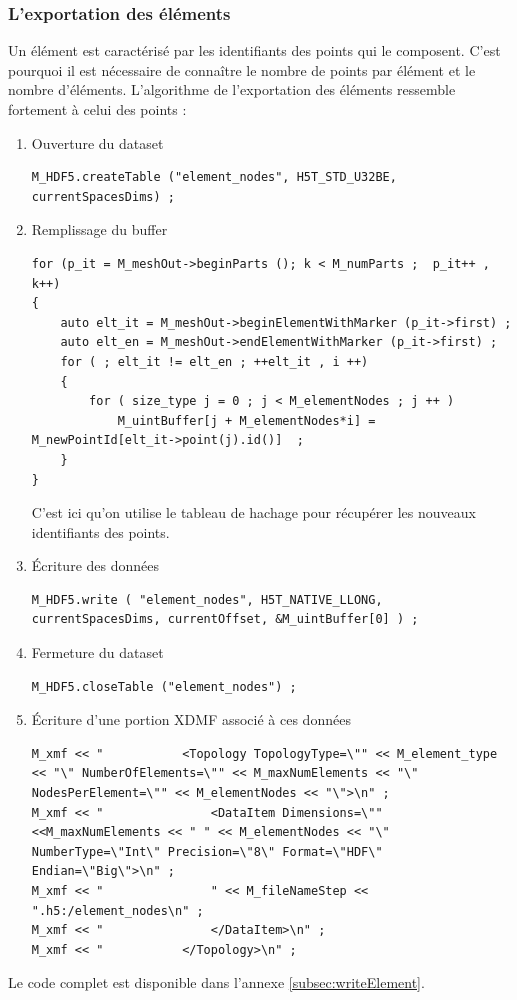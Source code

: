 \documentclass[12pt]{article}
\begin{document}
\subsubsection{L'exportation des éléments}
\label{subsec:exportationelement}
Un élément est caractérisé par les identifiants des points qui le composent. C'est pourquoi il est nécessaire de connaître le nombre de points par élément et le nombre d'éléments. L'algorithme de l'exportation des éléments ressemble fortement à celui des points :
\begin{enumerate}
\item Ouverture du dataset
\begin{lstlisting}
M_HDF5.createTable ("element_nodes", H5T_STD_U32BE, currentSpacesDims) ;
\end{lstlisting}
\item Remplissage du buffer
\begin{lstlisting}
for (p_it = M_meshOut->beginParts (); k < M_numParts ;  p_it++ , k++)
{
    auto elt_it = M_meshOut->beginElementWithMarker (p_it->first) ;
    auto elt_en = M_meshOut->endElementWithMarker (p_it->first) ;
    for ( ; elt_it != elt_en ; ++elt_it , i ++)
    {
        for ( size_type j = 0 ; j < M_elementNodes ; j ++ )
            M_uintBuffer[j + M_elementNodes*i] = M_newPointId[elt_it->point(j).id()]  ; 
    }
}
\end{lstlisting}
C'est ici qu'on utilise le tableau de hachage pour récupérer les nouveaux identifiants des points.
\item \'Ecriture des données
\begin{lstlisting}
M_HDF5.write ( "element_nodes", H5T_NATIVE_LLONG, currentSpacesDims, currentOffset, &M_uintBuffer[0] ) ;
\end{lstlisting}
\item Fermeture du dataset
\begin{lstlisting}
M_HDF5.closeTable ("element_nodes") ;
\end{lstlisting}
\item \'Ecriture d'une portion XDMF associé à ces données
\begin{lstlisting}
M_xmf << "           <Topology TopologyType=\"" << M_element_type << "\" NumberOfElements=\"" << M_maxNumElements << "\" NodesPerElement=\"" << M_elementNodes << "\">\n" ;
M_xmf << "               <DataItem Dimensions=\"" <<M_maxNumElements << " " << M_elementNodes << "\" NumberType=\"Int\" Precision=\"8\" Format=\"HDF\" Endian=\"Big\">\n" ;
M_xmf << "               " << M_fileNameStep << ".h5:/element_nodes\n" ;
M_xmf << "               </DataItem>\n" ;
M_xmf << "           </Topology>\n" ;
\end{lstlisting}
\end{enumerate}
Le code complet est disponible dans l'annexe \ref{subsec:writeElement}.
\end{document}

